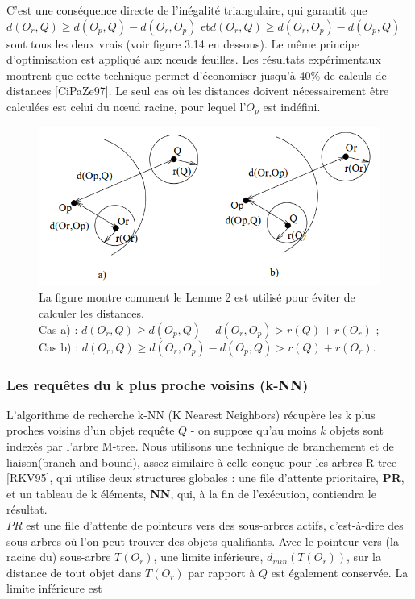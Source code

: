 C'est une conséquence directe de l'inégalité triangulaire, qui garantit que $ d(O_r, Q) \ge d(O_p, Q)-d(O_r, O_p) $ et$  d(O_r, Q) \ge d(O_r, O_p)-d(O_p, Q) $ sont tous les deux vrais (voir figure 3.14 en dessous). Le même principe d'optimisation est appliqué aux nœuds feuilles. Les résultats expérimentaux montrent que cette technique permet d'économiser jusqu'à 40\% de calculs de distances [CiPaZe97]. Le seul cas où les distances doivent nécessairement être calculées est celui du nœud racine, pour lequel l'$ O_p $ est indéfini.

\begin{figure}[H]
	\centering
	\includegraphics[width=.6 \textwidth]{Figures/lemme.png} %
	\caption{La figure montre comment le Lemme 2 est utilisé pour éviter de calculer les distances. \\Cas a) : $ d(O_r, Q) \ge d(O_p, Q) - d(O_r, O_p) > r(Q) + r(O_r) $ ; \\
		Cas b) : $ d(O_r, Q) \ge d(O_r, O_p) - d(O_p, Q) > r(Q) + r(O_r) $.}
\end{figure} 

\subsubsection{Les requêtes du k plus proche voisins (k-NN)}

L'algorithme de recherche k-NN (K Nearest Neighbors) récupère les k plus proches voisins d'un objet requête $ Q $ - on suppose qu'au moins $ k $ objets sont indexés par l'arbre M-tree. Nous utilisons une technique de branchement et de liaison(branch-and-bound), assez similaire à celle conçue pour les arbres R-tree [RKV95], qui utilise deux structures globales : une file d'attente prioritaire, \textbf{PR}, et un tableau de k éléments, \textbf{NN}, qui, à la fin de l'exécution, contiendra le résultat.\\

$ PR $ est une file d'attente de pointeurs vers des sous-arbres actifs, c'est-à-dire des sous-arbres où l'on peut trouver des objets qualifiants. Avec le pointeur vers (la racine du) sous-arbre $ T (O_r) $, une limite inférieure, $ d_{min}(T (O_r)) $, sur la distance de tout objet dans $ T (O_r) $ par rapport à $ Q $ est également conservée. La limite inférieure est

